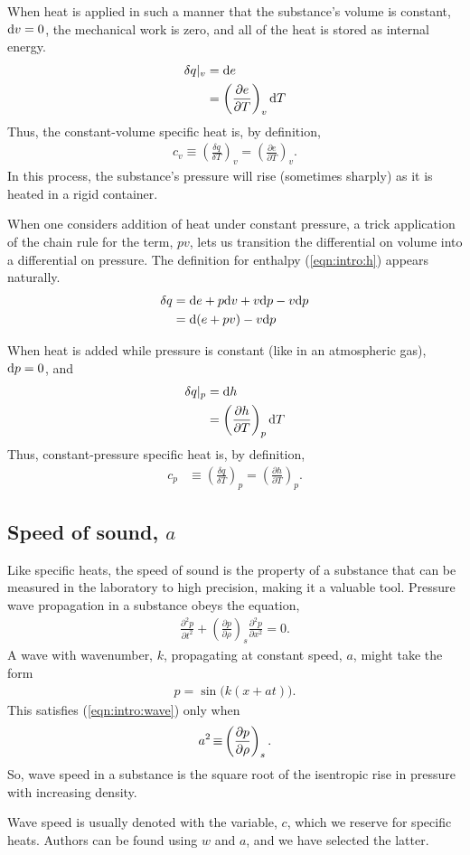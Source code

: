 When heat is applied in such a manner that the substance's volume is constant, $\mathrm{d} v = 0$, the mechanical work is zero, and all of the heat is stored as internal energy.
\begin{align}
\delta q |_v &= \mathrm{d} e\nonumber\\
 &= \left(\frac{\partial e}{\partial T}\right)_v \mathrm{d} T
\end{align}
Thus, the constant-volume specific heat is, by definition, 
\begin{align}
c_v \equiv \left(\frac{\delta q}{\delta T}\right)_v = \left(\frac{\partial e}{\partial T}\right)_v.\label{eqn:intro:cv}
\end{align}
In this process, the substance's pressure will rise (sometimes sharply) as it is heated in a rigid container.

When one considers addition of heat under constant pressure, a trick application of the chain rule for the term, $pv$, lets us transition the differential on volume into a differential on pressure.  The definition for enthalpy (\ref{eqn:intro:h}) appears naturally.
\begin{align}
\delta q &= \mathrm{d} e + p \mathrm{d} v + v\mathrm{d} p - v \mathrm{d} p\nonumber\\
 &= \mathrm{d}(e + pv) - v\mathrm{d} p
\end{align}

When heat is added while pressure is constant (like in an atmospheric gas), $\mathrm{d} p=0$, and 
\begin{align}
\delta q |_p &= \mathrm{d} h\nonumber\\
 &= \left( \frac{\partial h}{\partial T}\right)_p \mathrm{d} T
\end{align}
Thus, constant-pressure specific heat is, by definition,
\begin{align}
c_p &\equiv \left(\frac{\delta q}{\delta T}\right)_p = \left( \frac{\partial h}{\partial T}\right)_p.\label{eqn:intro:cp}
\end{align}


\subsection{Speed of sound, $a$}\label{sec:intro:a}

Like specific heats, the speed of sound is the property of a substance that can be measured in the laboratory to high precision, making it a valuable tool.  Pressure wave propagation in a substance obeys the equation,
\begin{align}
\frac{\partial^2 p}{\partial t^2} + \left( \frac{\partial p}{\partial \rho} \right)_s \frac{\partial^2 p}{\partial x^2} = 0.\label{eqn:intro:wave}
\end{align}
A wave with wavenumber, $k$, propagating at constant speed, $a$, might take the form
\begin{align*}
p = \sin\Big(k (x + a t)\Big).
\end{align*}
This satisfies (\ref{eqn:intro:wave}) only when
\begin{align}
a^2 \operatorname*{\equiv} \left( \frac{\partial p}{\partial \rho} \right)_s.\label{eqn:intro:sound}
\end{align}
So, wave speed in a substance is the square root of the isentropic rise in pressure with increasing density.  

Wave speed is usually denoted with the variable, $c$, which we reserve for specific heats.  Authors can be found using $w$ and $a$, and we have selected the latter.  

%
% 
%
